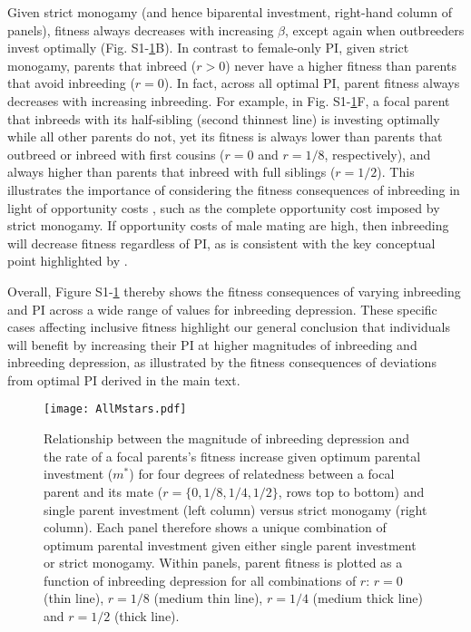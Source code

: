 \documentclass[12pt]{article}
\begin{document}
Given strict monogamy (and hence biparental investment, right-hand column of panels), fitness always decreases with increasing $\beta$, except again when outbreeders invest optimally (Fig. S1-\ref{AllMstars}B). In contrast to female-only PI, given strict monogamy, parents that inbreed ($r>0$) never have a higher fitness than parents that avoid inbreeding ($r=0$). In fact, across all optimal PI, parent fitness always decreases with increasing inbreeding. For example, in Fig. S1-\ref{AllMstars}F, a focal parent that inbreeds with its half-sibling (second thinnest line) is investing optimally while all other parents do not, yet its fitness is always lower than parents that outbreed or inbreed with first cousins ($r=0$ and $r=1/8$, respectively), and always higher than parents that inbreed with full siblings ($r=1/2$). This illustrates the importance of considering the fitness consequences of inbreeding in light of opportunity costs \cite[][]{Waser1986}, such as the complete opportunity cost imposed by strict monogamy. If opportunity costs of male mating are high, then inbreeding will decrease fitness regardless of PI, as is consistent with the key conceptual point highlighted by \cite{Waser1986}.

Overall, Figure S1-\ref{AllMstars} thereby shows the fitness consequences of varying inbreeding and PI across a wide range of values for inbreeding depression. These specific cases affecting inclusive fitness highlight our general conclusion that individuals will benefit by increasing their PI at higher magnitudes of inbreeding and inbreeding depression, as illustrated by the fitness consequences of deviations from optimal PI derived in the main text.

\clearpage

\begin{figure}[H]
\begin{center}				
\texttt{[image: AllMstars.pdf]}
\end{center}
\caption{Relationship between the magnitude of inbreeding depression and the rate of a focal parents's fitness increase given optimum parental investment ($m^{*}$) for four degrees of relatedness between a focal parent and its mate ($r=\{0, 1/8, 1/4, 1/2\}$, rows top to bottom) and single parent investment (left column) versus strict monogamy (right column). Each panel therefore shows a unique combination of optimum parental investment given either single parent investment or strict monogamy. Within panels, parent fitness is plotted as a function of inbreeding depression for all combinations of $r$: $r=0$ (thin line), $r=1/8$ (medium thin line), $r=1/4$ (medium thick line) and $r=1/2$ (thick line).}
\label{AllMstars}
\end{figure}

\clearpage



\end{document}
